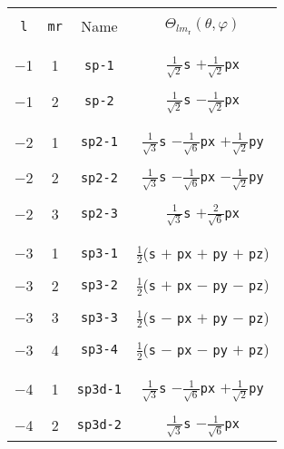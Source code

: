 \begin{table}
\begin{center}
\begin{tabular}{|cccc|}
\hline\hline
&&&\\
\verb#l# & \verb#mr# & Name & $\Theta_{lm_{\mathrm{r}}}(\theta,\varphi)$ \\ 
&&&\\\hline&&&\\
 $-$1  &  1  &  \verb#sp-1#   &  
$\frac{1}{\sqrt{2}}$\verb#s# $+\frac{1}{\sqrt{2}}$\verb#px# \\
&&&\\
 $-$1  &  2  &  \verb#sp-2#   &  
$\frac{1}{\sqrt{2}}$\verb#s# $-\frac{1}{\sqrt{2}}$\verb#px# \\
&&&\\\hline&&&\\
 $-$2  &  1  &  \verb#sp2-1#   &  
$\frac{1}{\sqrt{3}}$\verb#s# $-\frac{1}{\sqrt{6}}$\verb#px#
$+\frac{1}{\sqrt{2}}$\verb#py# \\  
&&&\\
 $-$2  &  2  &  \verb#sp2-2#   &  
$\frac{1}{\sqrt{3}}$\verb#s# $-\frac{1}{\sqrt{6}}$\verb#px#
$-\frac{1}{\sqrt{2}}$\verb#py# \\  
&&&\\
 $-$2  &  3  &  \verb#sp2-3#   &  
$\frac{1}{\sqrt{3}}$\verb#s# $+\frac{2}{\sqrt{6}}$\verb#px# \\
&&&\\\hline&&&\\
 $-$3  &  1  &  \verb#sp3-1#   &  
$\frac{1}{2}$(\verb#s# $+$ \verb#px# $+$ \verb#py# $+$ \verb#pz#) \\ 
&&&\\
 $-$3  &  2  &  \verb#sp3-2#   &  
$\frac{1}{2}$(\verb#s# $+$ \verb#px# $-$ \verb#py# $-$ \verb#pz#) \\ 
&&&\\
 $-$3  &  3  &  \verb#sp3-3#   &  
$\frac{1}{2}$(\verb#s# $-$ \verb#px# $+$ \verb#py# $-$ \verb#pz#) \\ 
&&&\\
 $-$3  &  4  &  \verb#sp3-4#   &  
$\frac{1}{2}$(\verb#s# $-$ \verb#px# $-$ \verb#py# $+$ \verb#pz#) \\ 
&&&\\\hline&&&\\
 $-$4  &  1  &  \verb#sp3d-1#  & 
$\frac{1}{\sqrt{3}}$\verb#s# $-\frac{1}{\sqrt{6}}$\verb#px#
$+\frac{1}{\sqrt{2}}$\verb#py#\\
&&&\\
 $-$4  &  2  &  \verb#sp3d-2#  &
$\frac{1}{\sqrt{3}}$\verb#s# $-\frac{1}{\sqrt{6}}$\verb#px#

\end{tabular}
\end{center}
\end{table}
